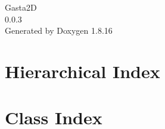 \let\mypdfximage\pdfximage\def\pdfximage{\immediate\mypdfximage}\documentclass[twoside]{book}
\newcommand{\+}{\discretionary{\mbox{\scriptsize$\hookleftarrow$}}{}{}}
\newcommand{\clearemptydoublepage}{%
  \newpage{\pagestyle{empty}\cleardoublepage}%
}
\begin{document}
\hypersetup{pageanchor=false,
             bookmarksnumbered=true,
             pdfencoding=unicode
            }
\begin{titlepage}
\vspace*{7cm}
\begin{center}%
{\Large Gasta2D \\[1ex]\large 0.\+0.\+3 }\\
\vspace*{1cm}
{\large Generated by Doxygen 1.8.16}\\
\end{center}
\end{titlepage}
\clearemptydoublepage
{}
\tableofcontents
\clearemptydoublepage
{}
\hypersetup{pageanchor=true}

\chapter{Hierarchical Index}

\chapter{Class Index}

\end{document}

